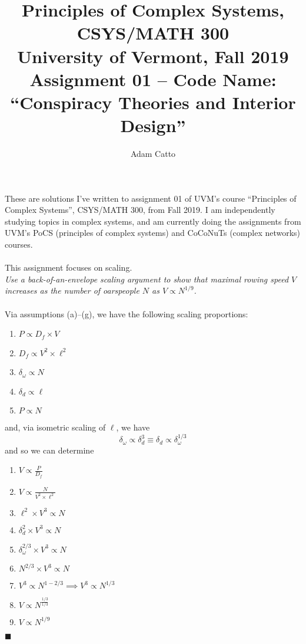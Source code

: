 \documentclass{article}[11pt]
\title{Principles of Complex Systems, CSYS/MATH 300\\
		University of Vermont, Fall 2019\\
		Assignment 01 – Code Name: ``Conspiracy Theories and Interior Design''}
\author{Adam Catto}
\begin{document}
\maketitle
These are solutions I've written to assignment 01 of UVM's course ``Principles of Complex Systems'', CSYS/MATH 300, from Fall 2019. I am independently studying topics in complex systems, and am currently doing the assignments from UVM's PoCS (principles of complex systems) and CoCoNuTs (complex networks) courses.\\
 \\
This assignment focuses on scaling.
\newpage
{}\\
\textit{Use a back-of-an-envelope scaling argument to show that maximal rowing speed $V$ increases as the number of oarspeople $N$ as $V \propto  N^{1/9}$.}\\ 
 \\
Via assumptions (a)–(g), we have the following scaling proportions:
\begin{enumerate}
	\item $P\propto D_f \times V$
	\item $D_f \propto V^2\times\ell^2$
	\item $\delta_{\omega} \propto N$
	\item $\delta_d \propto \ell$
	\item $P\propto N$
\end{enumerate}
and, via isometric scaling of $\ell$, we have 
$$ \delta_{\omega} \propto \delta_d^3 \equiv \delta_d \propto \delta_{\omega}^{1/3} $$
and so we can determine
\begin{enumerate}
	\item $V\propto \frac{P}{D_f} $
	\item $V\propto \frac{N}{V^2\times \ell^2}$
	\item $\ell^2\times V^3 \propto N$
	\item $\delta_d^2 \times V^3 \propto N$
	\item $\delta_{\omega}^{2/3}\times V^3 \propto N$
	\item $N^{2/3}\times V^3 \propto N$
	\item $V^3\propto N^{1-2/3} \implies V^3\propto N^{1/3}$
	\item $V\propto N^{\frac{1/3}{1/3}}$
	\item $V\propto N^{1/9}$
\end{enumerate}
\hfill $\blacksquare$
\end{document}
